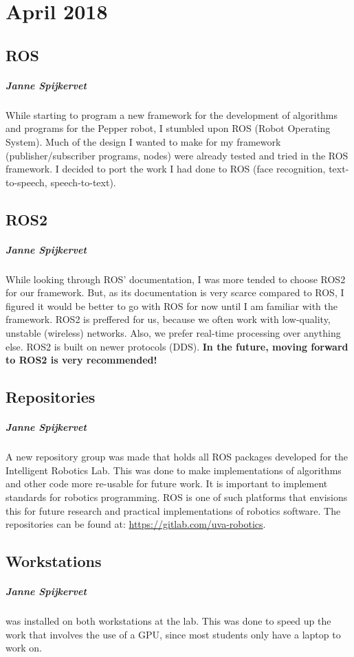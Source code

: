 
\chapter{April 2018}
\label{ch:april-2018}

\section{ROS}
\paragraph{Janne Spijkervet}
While starting to program a new framework for the development of algorithms and programs for the Pepper robot, I stumbled upon ROS (Robot Operating System). Much of the design I wanted to make for my framework (publisher/subscriber programs, nodes) were already tested and tried in the ROS framework. I decided to port the work I had done to ROS (face recognition, text-to-speech, speech-to-text).

\section{ROS2}
\paragraph{Janne Spijkervet}
While looking through ROS' documentation, I was more tended to choose ROS2 for our framework. But, as its documentation is very scarce compared to ROS, I figured it would be better to go with ROS for now until I am familiar with the framework. ROS2 is preffered for us, because we often work with low-quality, unstable (wireless) networks. Also, we prefer real-time processing over anything else. ROS2 is built on newer protocols (DDS). \textbf{In the future, moving forward to ROS2 is very recommended!}


\section{Repositories}\label{sec:repositories}
\paragraph{Janne Spijkervet}
A new repository group was made that holds all ROS packages developed for the Intelligent Robotics Lab. This was done to make implementations of algorithms and other code more re-usable for future work. It is important to implement standards for robotics programming. ROS is one of such platforms that envisions this for future research and practical implementations of robotics software. The repositories can be found at: \url{https://gitlab.com/uva-robotics}.

\section{Workstations}\label{sec:workstations}
\paragraph{Janne Spijkervet}
 was installed on both workstations at the lab. This was done to speed up the work that involves the use of a GPU, since most students only have a laptop to work on.
